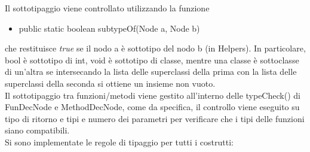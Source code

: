 \documentclass[a4paper]{article}   %
\begin{document}
Il sottotipaggio viene controllato utilizzando la funzione
\begin{itemize}
\item public static boolean subtypeOf(Node a, Node b)
\end{itemize}
che restituisce \textit{true} se il nodo a è sottotipo del nodo b (in Helpers).
In particolare, bool è sottotipo di int, void è sottotipo di classe, mentre una classe è sottoclasse di un'altra se
intersecando la lista delle superclassi della prima con la lista delle superclassi della seconda si ottiene un insieme non vuoto.\\
Il sottotipaggio tra funzioni/metodi viene gestito all'interno delle typeCheck() di FunDecNode e MethodDecNode, come da specifica, il controllo viene eseguito
su tipo di ritorno e tipi e numero dei parametri per verificare che i tipi delle funzioni siano compatibili.\\
\newline
Si sono implementate le regole di tipaggio per tutti i costrutti:
\end{document}
